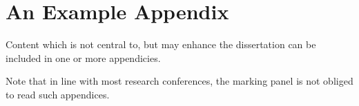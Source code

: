 \documentclass[ %
                    author={Lucas O'Dowd-Jones},
                supervisor={Dr. Alex Kavvos},
                    degree={MEng},
                     title={Variations on Normalisation by Evaluation in Haskell},
                  subtitle={},
                      type={programming languages},
                      year={2021} ]{dissertation}
\begin{document}
\backmatter

\printbibliography



\appendix

\chapter{An Example Appendix}
\label{appx:example}

Content which is not central to, but may enhance the dissertation can be 
included in one or more appendicies.

\noindent
Note that in line with most research conferences, the marking panel is not
obliged to read such appendices.

\end{document}
